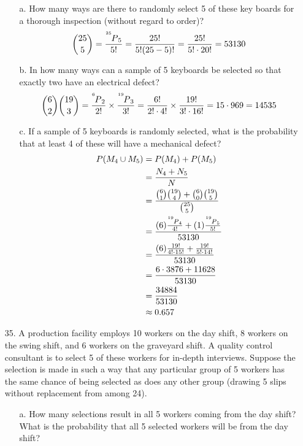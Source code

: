 \documentclass[letterpaper,12pt]{article}
\newcommand\perm[2]{\prescript{^{#1}\mkern-2.5mu}{}P_{#2}}
\newcommand\calc[1]{\pgfmathparse{#1}\pgfmathprintnumber{\pgfmathresult}}
\newcommand\comba[2]{\frac{\perm{#1}{#2}}{#2!}}
\newcommand\combb[2]{\frac{#1!}{#2!(#1 - #2)!}}
\newcommand\combc[2]{\frac{#1!}{#2! \cdot \calc{#1 - #2}!}}
\begin{document}
\begin{enumerate}
    \begin{enumerate}
      \item[a.]
        How many ways are there to randomly select 5 of these key boards for a thorough inspection (without regard to order)?
        \begin{align*}
          \binom{25}{5} = \comba{25}{5} = \combb{25}{5} = \combc{25}{5} = 53130
        \end{align*}
      \item[b.]
        In how many ways can a sample of 5 keyboards be selected so that exactly two have an electrical defect?
        \begin{align*}
          \binom{6}{2} \binom{19}{3} = \comba{6}{2} \times \comba{19}{3} = \combc{6}{2} \times \combc{19}{3} = 15 \cdot 969 = 14535
        \end{align*}
      \item[c.]
        If a sample of 5 keyboards is randomly selected, what is the probability that at least 4 of these will have a mechanical defect?
        \begin{align*}
          P(M_4 \cup M_5) &= P(M_4) + P(M_5) \\
          &= \frac{N_4 + N_5}{N} \\
          &= \frac{\binom{6}{1} \binom{19}{4} + \binom{6}{0} \binom{19}{5}}{\binom{25}{5}} \\
          &= \frac{(6)\comba{19}{4} + (1)\comba{19}{5}}{53130} \\
          &= \frac{(6)\combc{19}{4} + \combc{19}{5}}{53130} \\
          &= \frac{6 \cdot 3876 + 11628}{53130} \\
          &= \frac{34884}{53130} \\
          &\approx 0.657
        \end{align*}
    \end{enumerate}
  \item[35.]
    A production facility employs 10 workers on the day shift, 8 workers on the swing shift, and 6 workers on the graveyard shift. A quality control consultant is to select 5 of these workers for in-depth interviews. Suppose the selection is made in such a way that any particular group of 5 workers has the same chance of being selected as does any other group (drawing 5 slips without replacement from among 24).
    \begin{enumerate}
      \item[a.]
        How many selections result in all 5 workers coming from the day shift? What is the probability that all 5 selected workers will be from the day shift?

\end{enumerate}
\end{enumerate}
\end{document}
